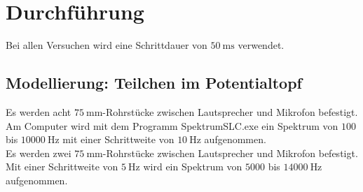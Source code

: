 \section{Durchführung}
\label{sec:Durchführung}

Bei allen Versuchen wird eine Schrittdauer von $\SI{50}{\milli\second}$ verwendet.

\subsection{Modellierung: Teilchen im Potentialtopf}

Es werden acht $\SI{75}{\milli\metre}$-Rohrstücke zwischen Lautsprecher und Mikrofon befestigt. Am Computer wird mit dem Programm SpektrumSLC.exe ein Spektrum von $100$ bis $\SI{10000}{\hertz}$ mit einer Schrittweite von $\SI{10}{\hertz}$ aufgenommen.\\
Es werden zwei $\SI{75}{\milli\metre}$-Rohrstücke zwischen Lautsprecher und Mikrofon befestigt. Mit einer Schrittweite von $\SI{5}{\hertz}$ wird ein Spektrum von $5000$ bis $\SI{14000}{\hertz}$ aufgenommen.

